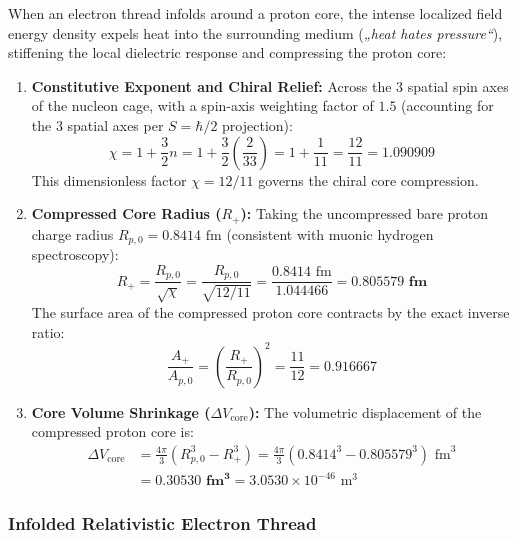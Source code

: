 \documentclass[11pt,a4paper]{article}
\begin{document}
When an electron thread infolds around a proton core, the intense localized field energy density expels heat into the surrounding medium (\textit{„heat hates pressure“}), stiffening the local dielectric response and compressing the proton core:
\begin{enumerate}
    \item \textbf{Constitutive Exponent and Chiral Relief:} Across the 3 spatial spin axes of the nucleon cage, with a spin-axis weighting factor of $1.5$ (accounting for the 3 spatial axes per $S = \hbar/2$ projection):
    \begin{equation}
    \chi = 1 + \frac{3}{2} n = 1 + \frac{3}{2}\left(\frac{2}{33}\right) = 1 + \frac{1}{11} = \frac{12}{11} = 1.090909
    \end{equation}
    This dimensionless factor $\chi = 12/11$ governs the chiral core compression.
    \item \textbf{Compressed Core Radius ($R_+$):} Taking the uncompressed bare proton charge radius $R_{p,0} = 0.8414\text{ fm}$ (consistent with muonic hydrogen spectroscopy):
    \begin{equation}
    R_+ = \frac{R_{p,0}}{\sqrt{\chi}} = \frac{R_{p,0}}{\sqrt{12/11}} = \frac{0.8414\text{ fm}}{1.044466} = \mathbf{0.805579\text{ fm}}
    \end{equation}
    The surface area of the compressed proton core contracts by the exact inverse ratio:
    \begin{equation}
    \frac{A_+}{A_{p,0}} = \left(\frac{R_+}{R_{p,0}}\right)^2 = \frac{11}{12} = 0.916667
    \end{equation}
    \item \textbf{Core Volume Shrinkage ($\Delta V_{\text{core}}$):} The volumetric displacement of the compressed proton core is:
    \begin{equation}
    \begin{aligned}
    \Delta V_{\text{core}} &= \frac{4\pi}{3}\left(R_{p,0}^3 - R_+^3\right) = \frac{4\pi}{3}\left(0.8414^3 - 0.805579^3\right)\text{ fm}^3 \\
    &= \mathbf{0.30530\text{ fm}^3} = 3.0530 \times 10^{-46}\text{ m}^3
    \end{aligned}
    \end{equation}
\end{enumerate}

\subsubsection{Infolded Relativistic Electron Thread}
\label{subsubsec:infolded_thread}
\end{document}
